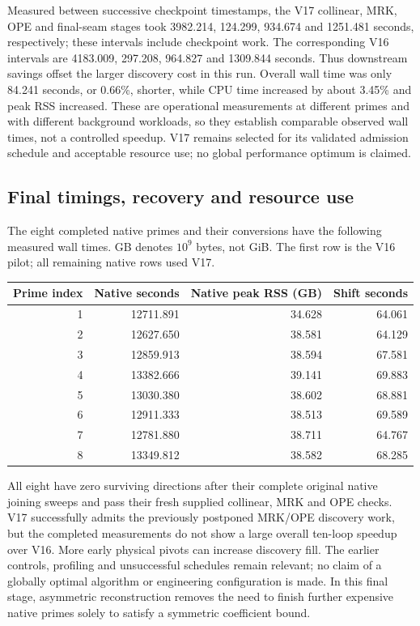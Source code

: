 \documentclass[11pt]{article}
\begin{document}
Measured between successive checkpoint timestamps, the V17 collinear,
MRK, OPE and final-seam stages took 3982.214, 124.299, 934.674 and
1251.481 seconds, respectively; these intervals include checkpoint work.
The corresponding V16 intervals are 4183.009, 297.208, 964.827 and
1309.844 seconds. Thus downstream savings offset the larger discovery
cost in this run. Overall wall time was only 84.241 seconds, or 0.66\%,
shorter, while CPU time increased by about 3.45\% and peak RSS increased.
These are operational measurements at different primes and with different
background workloads, so they establish comparable observed wall times,
not a controlled speedup. V17 remains selected for its validated admission
schedule and acceptable resource use; no global performance optimum is
claimed.

\subsection{Final timings, recovery and resource use}
The eight completed native primes and their conversions have the following
measured wall times. GB denotes $10^9$ bytes, not GiB. The first row is the
V16 pilot; all remaining native rows used V17.
\begin{center}
\begin{tabular}{rrrr}\toprule
Prime index & Native seconds & Native peak RSS (GB) & Shift seconds\\\midrule
1 & 12711.891 & 34.628 & 64.061\\
2 & 12627.650 & 38.581 & 64.129\\
3 & 12859.913 & 38.594 & 67.581\\
4 & 13382.666 & 39.141 & 69.883\\
5 & 13030.380 & 38.602 & 68.881\\
6 & 12911.333 & 38.513 & 69.589\\
7 & 12781.880 & 38.711 & 64.767\\
8 & 13349.812 & 38.582 & 68.285\\\bottomrule
\end{tabular}
\end{center}
All eight have zero surviving directions after their complete original
native joining sweeps and pass their fresh supplied collinear, MRK and OPE
checks. V17 successfully admits the previously postponed MRK/OPE discovery
work, but the completed measurements do not show a large overall ten-loop
speedup over V16. More early physical pivots can increase discovery fill.
The earlier controls, profiling and unsuccessful schedules remain relevant;
no claim of a globally optimal algorithm or engineering configuration is
made. In this final stage, asymmetric reconstruction removes the need to
finish further expensive native primes solely to satisfy a symmetric
coefficient bound.
\end{document}
